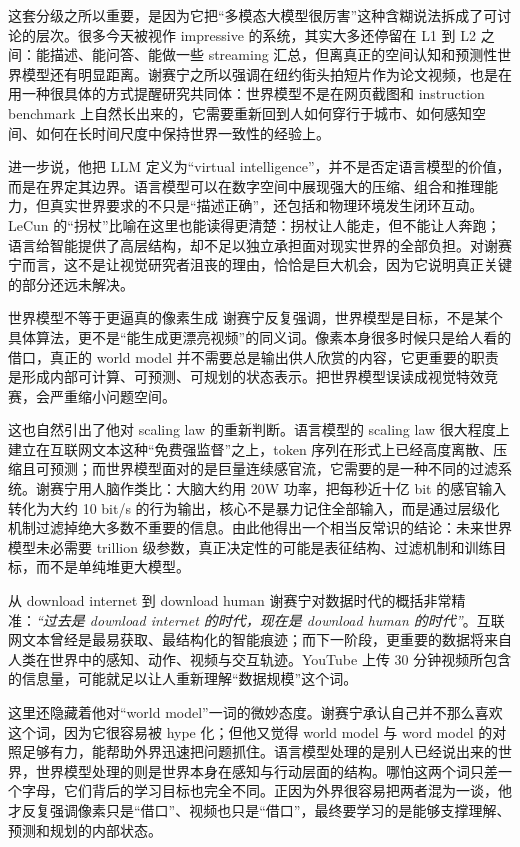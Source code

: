 这套分级之所以重要，是因为它把“多模态大模型很厉害”这种含糊说法拆成了可讨论的层次。很多今天被视作 impressive 的系统，其实大多还停留在 L1 到 L2 之间：能描述、能问答、能做一些 streaming 汇总，但离真正的空间认知和预测性世界模型还有明显距离。谢赛宁之所以强调在纽约街头拍短片作为论文视频，也是在用一种很具体的方式提醒研究共同体：世界模型不是在网页截图和 instruction benchmark 上自然长出来的，它需要重新回到人如何穿行于城市、如何感知空间、如何在长时间尺度中保持世界一致性的经验上。

进一步说，他把 LLM 定义为“virtual intelligence”，并不是否定语言模型的价值，而是在界定其边界。语言模型可以在数字空间中展现强大的压缩、组合和推理能力，但真实世界要求的不只是“描述正确”，还包括和物理环境发生闭环互动。LeCun 的“拐杖”比喻在这里也能读得更清楚：拐杖让人能走，但不能让人奔跑；语言给智能提供了高层结构，却不足以独立承担面对现实世界的全部负担。对谢赛宁而言，这不是让视觉研究者沮丧的理由，恰恰是巨大机会，因为它说明真正关键的部分还远未解决。

\begin{warningbox}{世界模型不等于更逼真的像素生成}
谢赛宁反复强调，世界模型是目标，不是某个具体算法，更不是“能生成更漂亮视频”的同义词。像素本身很多时候只是给人看的借口，真正的 world model 并不需要总是输出供人欣赏的内容，它更重要的职责是形成内部可计算、可预测、可规划的状态表示。把世界模型误读成视觉特效竞赛，会严重缩小问题空间。
\end{warningbox}

这也自然引出了他对 scaling law 的重新判断。语言模型的 scaling law 很大程度上建立在互联网文本这种“免费强监督”之上，token 序列在形式上已经高度离散、压缩且可预测；而世界模型面对的是巨量连续感官流，它需要的是一种不同的过滤系统。谢赛宁用人脑作类比：大脑大约用 20W 功率，把每秒近十亿 bit 的感官输入转化为大约 10 bit/s 的行为输出，核心不是暴力记住全部输入，而是通过层级化机制过滤掉绝大多数不重要的信息。由此他得出一个相当反常识的结论：未来世界模型未必需要 trillion 级参数，真正决定性的可能是表征结构、过滤机制和训练目标，而不是单纯堆更大模型。

\begin{importantbox}{从 download internet 到 download human}
谢赛宁对数据时代的概括非常精准：\textit{``过去是 download internet 的时代，现在是 download human 的时代''}。互联网文本曾经是最易获取、最结构化的智能痕迹；而下一阶段，更重要的数据将来自人类在世界中的感知、动作、视频与交互轨迹。YouTube 上传 30 分钟视频所包含的信息量，可能就足以让人重新理解“数据规模”这个词。
\end{importantbox}

这里还隐藏着他对“world model”一词的微妙态度。谢赛宁承认自己并不那么喜欢这个词，因为它很容易被 hype 化；但他又觉得 world model 与 word model 的对照足够有力，能帮助外界迅速把问题抓住。语言模型处理的是别人已经说出来的世界，世界模型处理的则是世界本身在感知与行动层面的结构。哪怕这两个词只差一个字母，它们背后的学习目标也完全不同。正因为外界很容易把两者混为一谈，他才反复强调像素只是“借口”、视频也只是“借口”，最终要学习的是能够支撑理解、预测和规划的内部状态。

